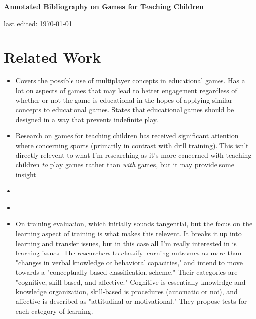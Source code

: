 \documentclass[12pt]{article}
\begin{document}
\begin{center}
   {\Large\textbf{Annotated Bibliography on Games for Teaching Children}}
\medskip

   { last edited: \today
   }
\end{center}

\section{Related Work} 

\begin{itemize}
\item\cite{paraskeva2010multiplayer} Covers the possible use of multiplayer concepts in educational games. Has a lot on aspects of games that may lead to better engagement regardless of whether or not the game is educational in the hopes of applying similar concepts to educational games. States that educational games should be designed in a way that prevents indefinite play.

\item\cite{holt2002expanding} Research on games for teaching children has received significant attention where concerning sports (primarily in contrast with drill training). This isn't directly relevent to what I'm researching as it's more concerned with teaching children \emph{to} play games rather than \emph{with} games, but it may provide some insight.

\item\cite{berns2021virtualreality}

\item\cite{dasilveira2021eguess}

\item\cite{kraiger1993application} On training evaluation, which initially sounds tangential, but the focus on the learning aspect of training is what makes this relevent. It breaks it up into learning and transfer issues, but in this case all I'm really interested in is learning issues. The researchers to classify learning outcomes as more than "changes in verbal knowledge or behavioral capacities," and intend to move towards a "conceptually based classification scheme." Their categories are "cognitive, skill-based, and affective." Cognitive is essentially knowledge and knowledge organization, skill-based is procedures (automatic or not), and affective is described as "attitudinal or motivational." They propose tests for each category of learning.
\end{itemize}
\end{document}

